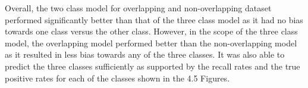\documentclass[12pt]{article}
\begin{document}
\begin{multicols*}{2}
  \hspace*{5mm} Overall, the two class model for overlapping and non-overlapping dataset performed significantly better than that of the three class model as it had no bias
  towards one class versus the other class. However, in the scope of the three class model, the overlapping model performed better than the non-overlapping model as it resulted in less
  bias towards any of the three classes. It was also able to predict the three classes sufficiently as supported by the recall rates and the true positive rates for each of the classes shown in the 4.5 Figures.  

\end{multicols*}

		

	
\end{document}
